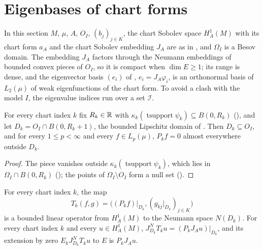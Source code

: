 \section{Eigenbases of chart forms}
\label{sec:chart-eigenbasis}

In this section $M$, $\mu$, $A$, $O_I$, $(b_j)_{j \in K}$, the chart Sobolev space $H^1_A(M)$
with its chart form $a_A$ and the chart Sobolev embedding $J_A$ are as in
, and $\Omega_I$ is a Besov domain. The embedding $J_A$ factors through
the Neumann embeddings of bounded convex pieces of $O_I$, so it is compact when $\dim E \geq 1$;
its range is dense, and the eigenvector basis $(e_i)$ of ,
$e_i = J_A \varphi_i$, is an orthonormal basis of $L_2(\mu)$ of weak eigenfunctions of the chart
form. To avoid a clash with
the model $I$, the eigenvalue indices run over a set $\mathcal{I}$.

\begin{definition}
\label{def:chart-piece-domain}
\leanok
{}
For every chart index $k$ fix $R_k \in \mathbb{R}$ with
$\kappa_k(\operatorname{tsupport} \psi_k) \subseteq B(0, R_k)$ (), and let
$D_k = O_I \cap B(0, R_k + 1)$, the bounded Lipschitz domain of . Then
$D_k \subseteq O_I$, and for every $1 \leq p < \infty$ and every $f \in L_p(\mu)$, $P_k f = 0$
almost everywhere outside $D_k$.
\end{definition}

\begin{proof}
\leanok
The piece vanishes outside $\kappa_k(\operatorname{tsupport} \psi_k)$, which lies in
$\Omega_I \cap B(0, R_k)$ (); the points of $\Omega_I \setminus O_I$ form
a null set ().
\end{proof}

\begin{definition}
\label{def:chart-to-neumann}
\leanok
{}
For every chart index $k$, the map
\[
  T_k (f, g) = \bigl( (P_k f)|_{D_k}, (g_{kj}|_{D_k})_{j \in K} \bigr)
\]
is a bounded linear operator from $H^1_A(M)$ to the Neumann space $N(D_k)$. For every chart index
$k$ and every $u \in H^1_A(M)$, $J^N_{D_k} T_k u = (P_k J_A u)|_{D_k}$, and its extension by zero
$E_k J^N_{D_k} T_k u$ to $E$ is $P_k J_A u$.
\end{definition}

